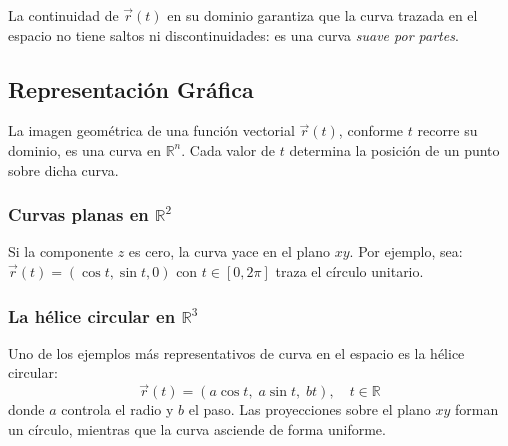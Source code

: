 La continuidad de $\vec{r}(t)$ en su dominio garantiza que la curva trazada en el espacio no tiene saltos ni discontinuidades: es una curva \textit{suave por partes}.


\subsection{Representación Gráfica}

La imagen geométrica de una función vectorial $\vec{r}(t)$, conforme $t$ recorre su dominio, es una curva en $\mathbb{R}^n$. Cada valor de $t$ determina la posición de un punto sobre dicha curva.

\subsubsection{Curvas planas en $\mathbb{R}^2$}

Si la componente $z$ es cero, la curva yace en el plano $xy$. Por ejemplo, sea: $\vec{r}(t) = (\cos t, \sin t, 0)$ con $t \in [0, 2\pi]$ traza el círculo unitario.

\begin{center}
\shorthandoff{>}
\end{center}

\subsubsection{La hélice circular en $\mathbb{R}^3$}

Uno de los ejemplos más representativos de curva en el espacio es la hélice circular:
\[ \vec{r}(t) = (a\cos t,\; a\sin t,\; bt), \quad t \in \mathbb{R} \]
donde $a$ controla el radio y $b$ el paso. Las proyecciones sobre el plano $xy$ forman un círculo, mientras que la curva asciende de forma uniforme.

